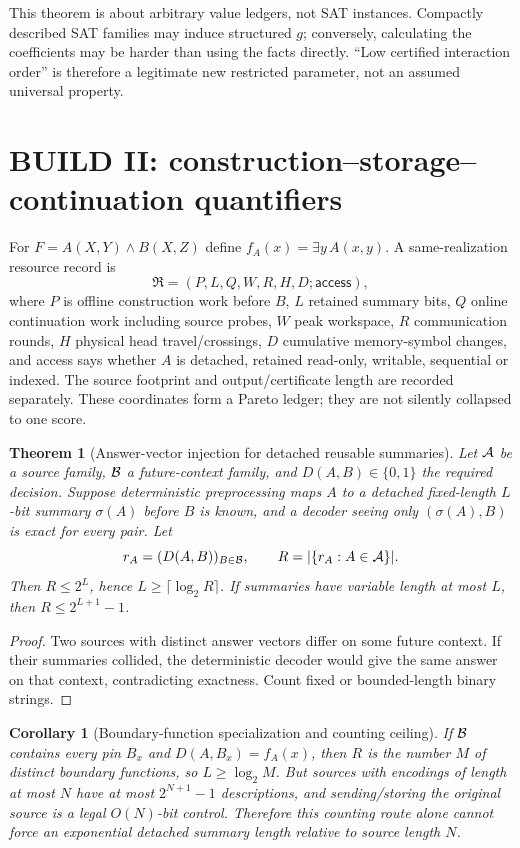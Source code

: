 \documentclass[11pt]{article}
\newtheorem{theorem}{Theorem}
\newtheorem{corollary}{Corollary}
\begin{document}
This theorem is about arbitrary value ledgers, not SAT instances.  Compactly
described SAT families may induce structured $g$; conversely, calculating the
coefficients may be harder than using the facts directly.  ``Low certified
interaction order'' is therefore a legitimate new restricted parameter, not
an assumed universal property.

\section{BUILD II: construction--storage--continuation quantifiers}
For $F=A(X,Y)\wedge B(X,Z)$ define
$f_A(x)=\exists y\,A(x,y)$.  A same-realization resource record is
\[
 \mathfrak R=(P,L,Q,W,R,H,D;\mathsf{access}),
\]
where $P$ is offline construction work before $B$, $L$ retained summary bits,
$Q$ online continuation work including source probes, $W$ peak workspace,
$R$ communication rounds, $H$ physical head travel/crossings, $D$ cumulative
memory-symbol changes, and \textsf{access} says whether $A$ is detached,
retained read-only, writable, sequential or indexed.  The source footprint and
output/certificate length are recorded separately.  These coordinates form a
Pareto ledger; they are not silently collapsed to one score.

\begin{theorem}[Answer-vector injection for detached reusable summaries]
Let ${\cal A}$ be a source family, ${\cal B}$ a future-context family, and
$D(A,B)\in\{0,1\}$ the required decision.  Suppose deterministic preprocessing
maps $A$ to a detached fixed-length $L$-bit summary $\sigma(A)$ before $B$ is
known, and a decoder seeing only $(\sigma(A),B)$ is exact for every pair.
Let
\[
 r_A=(D(A,B))_{B\in{\cal B}},\qquad
 R=|\{r_A:A\in{\cal A}\}|.
\]
Then $R\le2^L$, hence $L\ge\lceil\log_2R\rceil$.  If summaries have variable
length at most $L$, then $R\le2^{L+1}-1$.
\end{theorem}
\begin{proof}
Two sources with distinct answer vectors differ on some future context.  If
their summaries collided, the deterministic decoder would give the same answer
on that context, contradicting exactness.  Count fixed or bounded-length binary
strings.
\end{proof}

\begin{corollary}[Boundary-function specialization and counting ceiling]
If ${\cal B}$ contains every pin $B_x$ and
$D(A,B_x)=f_A(x)$, then $R$ is the number $M$ of distinct boundary functions,
so $L\ge\log_2M$.  But sources with encodings of length at most $N$ have at
most $2^{N+1}-1$ descriptions, and sending/storing the original source is a
legal $O(N)$-bit control.  Therefore this counting route alone cannot force an
exponential detached summary length relative to source length $N$.
\end{corollary}
\end{document}
